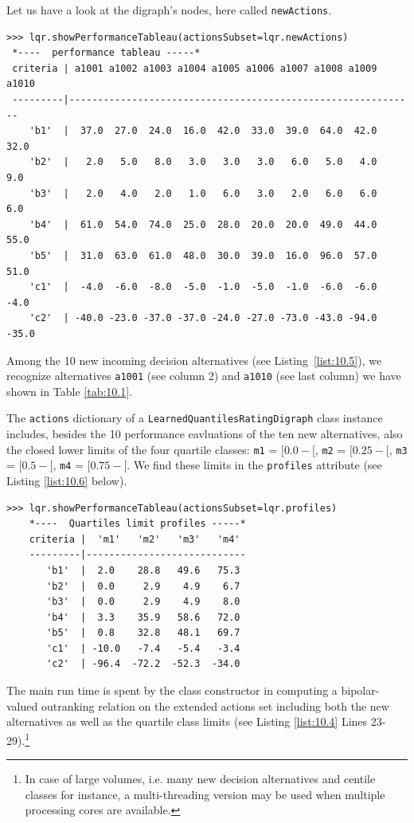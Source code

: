Let us have a look at the digraph's nodes, here called \texttt{newActions}.
\begin{lstlisting}[caption={Performance tableau of the new incoming decision alternatives},label=list:10.5,basicstyle=\ttfamily\scriptsize]
>>> lqr.showPerformanceTableau(actionsSubset=lqr.newActions)
 *----  performance tableau -----*
 criteria | a1001 a1002 a1003 a1004 a1005 a1006 a1007 a1008 a1009 a1010   
 ---------|-------------------------------------------------------------
    'b1'  |  37.0  27.0  24.0  16.0  42.0  33.0  39.0  64.0  42.0  32.0  
    'b2'  |   2.0   5.0   8.0   3.0   3.0   3.0   6.0   5.0   4.0   9.0  
    'b3'  |   2.0   4.0   2.0   1.0   6.0   3.0   2.0   6.0   6.0   6.0  
    'b4'  |  61.0  54.0  74.0  25.0  28.0  20.0  20.0  49.0  44.0  55.0  
    'b5'  |  31.0  63.0  61.0  48.0  30.0  39.0  16.0  96.0  57.0  51.0  
    'c1'  |  -4.0  -6.0  -8.0  -5.0  -1.0  -5.0  -1.0  -6.0  -6.0  -4.0  
    'c2'  | -40.0 -23.0 -37.0 -37.0 -24.0 -27.0 -73.0 -43.0 -94.0 -35.0  
\end{lstlisting}
  Among the 10 new incoming decision alternatives (see Listing~\ref{list:10.5}), we recognize alternatives \texttt{a1001} (see column 2) and \texttt{a1010} (see last column) we have shown in Table \ref{tab:10.1}.

The \texttt{actions} dictionary of a \texttt{LearnedQuantilesRatingDigraph} class instance includes, besides the 10 performance eavluations of the ten new alternatives, also the closed lower limits of the four quartile classes: \texttt{m1} = $[0.0- [$, \texttt{m2} = $[0.25- [$, \texttt{m3} = $[0.5- [$, \texttt{m4} = $[0.75 - [$. We find these limits in the \texttt{profiles} attribute (see Listing \ref{list:10.6} below).
\begin{lstlisting}[caption={Showing the limiting profiles of the rating quantiles},label=list:10.6]
>>> lqr.showPerformanceTableau(actionsSubset=lqr.profiles)
    *----  Quartiles limit profiles -----*
    criteria |  'm1'   'm2'   'm3'   'm4'   
    ---------|----------------------------
       'b1'  |  2.0    28.8   49.6   75.3  
       'b2'  |  0.0     2.9    4.9    6.7  
       'b3'  |  0.0     2.9    4.9    8.0  
       'b4'  |  3.3    35.9   58.6   72.0  
       'b5'  |  0.8    32.8   48.1   69.7  
       'c1'  | -10.0   -7.4   -5.4   -3.4  
       'c2'  | -96.4  -72.2  -52.3  -34.0  
\end{lstlisting}

The main run time is spent by the class constructor in computing a bipolar-valued outranking relation on the extended actions set including both the new alternatives as well as the quartile class limits (see Listing \ref{list:10.4} Lines 23-29).\footnote{In case of large volumes, i.e. many new decision alternatives and centile classes for instance, a multi-threading version may be used when multiple processing cores are available.}

